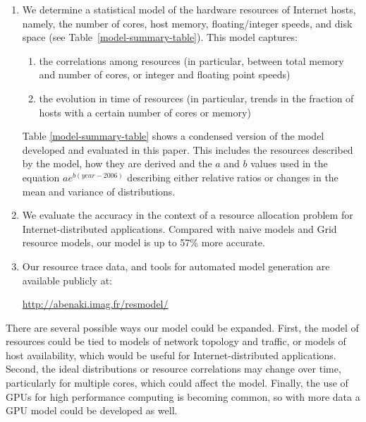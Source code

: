 \documentclass[conference]{IEEEtran}
\begin{document}
\begin{enumerate}
\item We determine a statistical model of the hardware
  resources of Internet hosts, namely, the number of cores,
  host memory, floating/integer speeds, and disk space (see
  Table~\ref{model-summary-table}).  This model captures:
 
  \begin{enumerate}
  \item the correlations among resources (in particular,
    between total memory and number of cores, or integer and
    floating point speeds)
  \item the evolution in time of resources (in particular,
    trends in the fraction of hosts with a certain number of
    cores or memory)
  \end{enumerate}
  
  Table \ref{model-summary-table} shows a condensed version
  of the model developed and evaluated in this paper.  This
  includes the resources described by the model, how they
  are derived and the $a$ and $b$ values used in the
  equation $a e^{b (year-2006)}$ describing either relative
  ratios or changes in the mean and variance of
  distributions.

\item We evaluate the accuracy in the
  context of a resource allocation problem for Internet-distributed applications.  Compared with naive models and
  Grid resource models, our model is up to 57\% more
  accurate.

\item Our resource trace data, and tools for automated model
  generation are available publicly at:
  
   \url{http://abenaki.imag.fr/resmodel/}
\end{enumerate}



There are several possible ways our model could be expanded.
First, the model of resources could be tied to models of
network topology and traffic, or models of host
availability, which would be useful for Internet-distributed
applications.  Second, the ideal distributions or resource correlations may
change over time, particularly for multiple cores, which could affect the model.
Finally, the use of GPUs for high performance computing is becoming common,
so with more data a GPU model could be developed as well.
\end{document}
